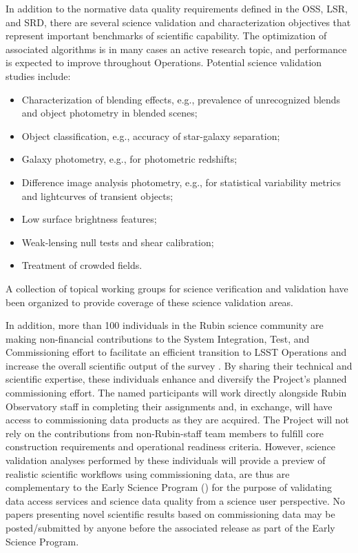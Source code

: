 In addition to the normative data quality requirements defined in the OSS, LSR, and SRD, there are several science validation and characterization objectives that represent important benchmarks of scientific capability. The optimization of associated algorithms is in many cases an active research topic, and performance is expected to improve throughout Operations. Potential science validation studies include:

\begin{itemize}
	\item  Characterization of blending effects, e.g., prevalence of unrecognized blends and object photometry in blended scenes;
	\item  Object classification, e.g., accuracy of star-galaxy separation;
	\item  Galaxy photometry, e.g., for photometric redshifts;
	\item  Difference image analysis photometry, e.g., for statistical variability metrics and lightcurves of transient objects;
	\item  Low surface brightness features;
	\item  Weak-lensing null tests and shear calibration;
	\item  Treatment of crowded fields.
\end{itemize}

A collection of topical working groups for science verification and validation have been organized to provide coverage of these science validation areas.

In addition, more than 100 individuals in the Rubin science community are making non-financial contributions to the System Integration, Test, and Commissioning effort to facilitate an efficient transition to LSST Operations and increase the overall scientific output of the survey . By sharing their technical and scientific expertise, these individuals enhance and diversify the Project's planned commissioning effort. The named participants will work directly alongside Rubin Observatory staff in completing their assignments and, in exchange, will have access to commissioning data products as they are acquired. The Project will not rely on the contributions from non-Rubin-staff team members to fulfill core construction requirements and operational readiness criteria. However, science validation analyses performed by these individuals will provide a preview of realistic scientific workflows using commissioning data, are thus are complementary to the Early Science Program () for the purpose of validating data access services and science data quality from a science user perspective. No papers presenting novel scientific results based on commissioning data may be posted/submitted by anyone before the associated release as part of the Early Science Program.

